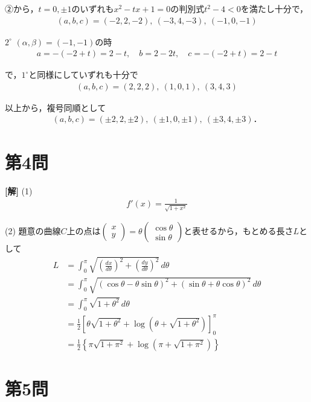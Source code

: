 \documentclass[../main.tex]{subfiles}
\begin{document}
②から，$t=0,\pm1$のいずれも$x^2-tx+1=0$の判別式$t^2-4<0$を満たし十分で，
\begin{align*}
  (a,b,c)=(-2,2,-2),\ (-3,4,-3),\ (-1,0,-1)
\end{align*}

$2^\circ$ $(\alpha,\beta)=(-1,-1)$の時
\begin{align*}
  a=-(-2+t)=2-t,\quad b=2-2t,\quad c=-(-2+t)=2-t
\end{align*}

で，$1^\circ$と同様にしていずれも十分で
\begin{align*}
  (a,b,c)=(2,2,2),\ (1,0,1),\ (3,4,3)
\end{align*}

以上から，複号同順として
\begin{align*}
  (a,b,c)=(\pm2,2,\pm2),\ (\pm1,0,\pm1),\ (\pm3,4,\pm3)．
\end{align*}

\newpage

\section*{第4問}

{\bf [解]}
(1)
\begin{align*}
  f'(x)=\frac1{\sqrt{1+x^2}}
\end{align*}

(2) 題意の曲線$C$上の点は$
\begin{pmatrix}x\\y
\end{pmatrix}=\theta
\begin{pmatrix}\cos\theta\\\sin\theta
\end{pmatrix}$と表せるから，もとめる長さ$L$として
\begin{align*}
  L&=\int_0^\pi\sqrt{\left(\frac{dx}{d\theta}\right)^2+\left(\frac{dy}{d\theta}\right)^2}\,d\theta\\
  &=\int_0^\pi\sqrt{(\cos\theta-\theta\sin\theta)^2+(\sin\theta+\theta\cos\theta)^2}\,d\theta\\
  &=\int_0^\pi\sqrt{1+\theta^2}\,d\theta\\
  &=\frac12\left[\theta\sqrt{1+\theta^2}+\log\left(\theta+\sqrt{1+\theta^2}\right)\right]_0^\pi\\
  &=\frac12\left\{\pi\sqrt{1+\pi^2}+\log\left(\pi+\sqrt{1+\pi^2}\right)\right\}
\end{align*}

\newpage

\section*{第5問}
\end{document}
